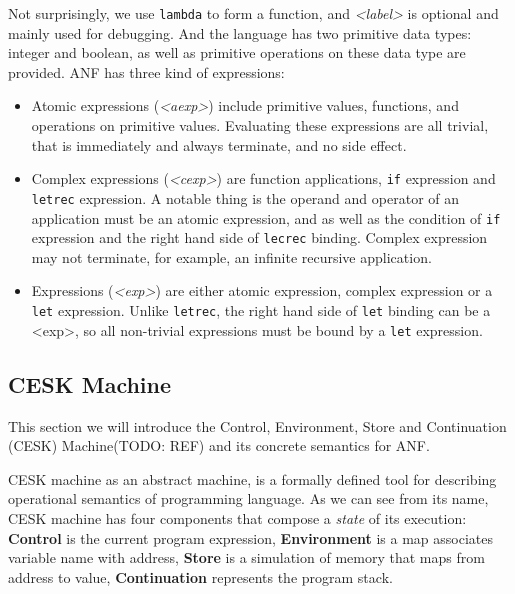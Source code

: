 \documentclass[paper=a4, fontsize=11pt]{scrartcl} %
\numberwithin{equation}{section} %
\numberwithin{figure}{section} %
\numberwithin{table}{section} %
\begin{document}
Not surprisingly, we use \texttt{lambda} to form a function, and \textit{<label>} is optional and mainly used for debugging. And the language has two primitive data types: integer and boolean, as well as primitive operations on these data type are provided. ANF has three kind of expressions:

\begin{itemize}
\item Atomic expressions (\textit{<aexp>}) include primitive values, functions, and operations on primitive values. Evaluating these expressions are all trivial, that is immediately and always terminate, and no side effect.

\item Complex expressions (\textit{<cexp>}) are function applications, \texttt{if} expression and \texttt{letrec} expression. A notable thing is the operand and operator of an application must be an atomic expression, and as well as the condition of \texttt{if} expression and the right hand side of \texttt{lecrec} binding. Complex expression may not terminate, for example, an infinite recursive application.

\item Expressions (\textit{<exp>}) are either atomic expression, complex expression or a \texttt{let} expression. Unlike \texttt{letrec}, the right hand side of \texttt{let} binding can be a <exp>, so all non-trivial expressions must be bound by a \texttt{let} expression.
\end{itemize}


\subsection{CESK Machine}

This section we will introduce the Control, Environment, Store and Continuation (CESK) Machine(TODO: REF) and its concrete semantics for ANF.

CESK machine as an abstract machine, is a formally defined tool for describing operational semantics of programming language. As we can see from its name, CESK machine has four components that compose a \textit{state} of its execution: \textbf{Control} is the current program expression, \textbf{Environment} is a map associates variable name with address, \textbf{Store} is a simulation of memory that maps from address to value, \textbf{Continuation} represents the program stack. 
\end{document}
